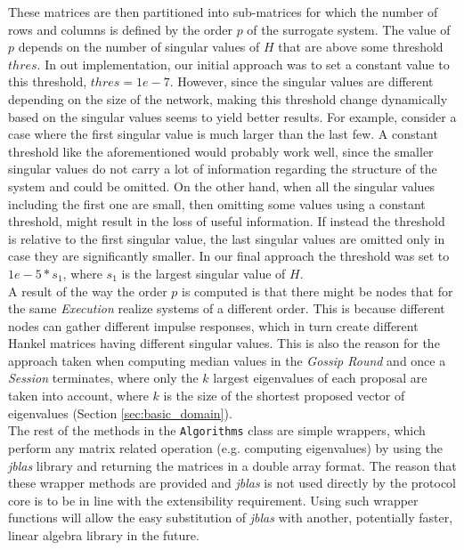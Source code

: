 \documentclass[a4paper,11pt,twoside]{report}
\newcommand{\classname}[1]{\texttt{#1}}
\begin{document}
These matrices are then partitioned into sub-matrices for which the number of rows and columns is defined by the order $p$ of the surrogate system. The value of $p$ depends on the number of singular values of $H$ that are above some threshold $thres$. In out implementation, our initial approach was to set a constant value to this threshold, $thres = 1e-7$. However, since the singular values are different depending on the size of the network, making this threshold change dynamically based on the singular values seems to yield better results. For example, consider a case where the first singular value is much larger than the last few. A constant threshold like the aforementioned would probably work well, since the smaller singular values do not carry a lot of information regarding the structure of the system and could be omitted. On the other hand, when all the singular values including the first one are small, then omitting some values using a constant threshold, might result in the loss of useful information. If instead the threshold is relative to the first singular value, the last singular values are omitted only in case they are significantly smaller. In our final approach the threshold was set to $1e-5*s_1$, where $s_1$ is the largest singular value of $H$. \\

A result of the way the order $p$ is computed is that there might be nodes that for the same \textit{Execution} realize systems of a different order. This is because different nodes can gather different impulse responses, which in turn create different Hankel matrices having different singular values. This is also the reason for the approach taken when computing median values in the \textit{Gossip Round} and once a \textit{Session} terminates, where only the $k$ largest eigenvalues of each proposal are taken into account, where $k$ is the size of the shortest proposed vector of eigenvalues (Section \ref{sec:basic_domain}).\\

The rest of the methods in the \classname{Algorithms} class are simple wrappers, which perform any matrix related operation (e.g. computing eigenvalues) by using the \textit{jblas} library and returning the matrices in a double array format. The reason that these wrapper methods are provided and \textit{jblas} is not used directly by the protocol core is to be in line with the extensibility requirement. Using such wrapper functions will allow the easy substitution of \textit{jblas} with another, potentially faster, linear algebra library in the future. 
\end{document}
